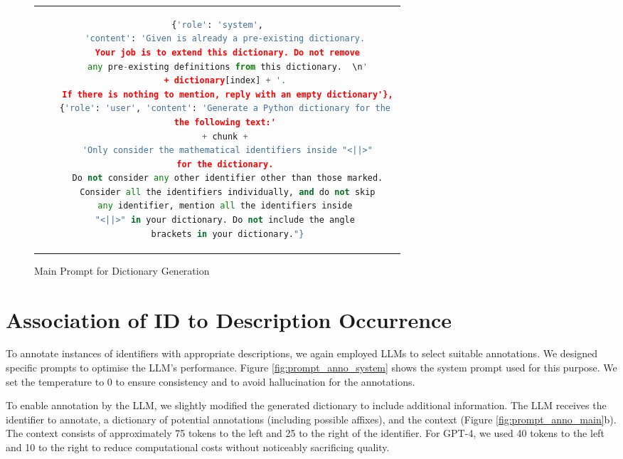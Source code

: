 \begin{figure}[htpb]
  \centering
  \begin{tabular}{c}
  \begin{lstlisting}[language=python]
    {'role': 'system',
    'content': 'Given is already a pre-existing dictionary. 
    Your job is to extend this dictionary. Do not remove
    any pre-existing definitions from this dictionary.  \n'
    + dictionary[index] + '. 
    If there is nothing to mention, reply with an empty dictionary'},
    {'role': 'user', 'content': 'Generate a Python dictionary for the 
    the following text:' 
    + chunk + 
    'Only consider the mathematical identifiers inside "<||>"
    for the dictionary. 
    Do not consider any other identifier other than those marked.
    Consider all the identifiers individually, and do not skip
    any identifier, mention all the identifiers inside 
    "<||>" in your dictionary. Do not include the angle 
    brackets in your dictionary."}
  \end{lstlisting}
  \end{tabular}
  \caption[Main Prompt for Dictionary Generation]{Main Prompt for Dictionary Generation} \label{fig:prompt_dic}
\end{figure}


\section{Association of ID to Description Occurrence}\label{sec:annotation}

To annotate instances of identifiers with appropriate descriptions, we again employed \ac{LLMs} to select suitable annotations. We designed specific prompts to optimise the LLM's performance. Figure \ref{fig:prompt_anno_system} shows the system prompt used for this purpose. We set the temperature to 0 to ensure consistency and to avoid hallucination for the annotations.

To enable annotation by the LLM, we slightly modified the generated dictionary to include additional information. The LLM receives the identifier to annotate, a dictionary of potential annotations (including possible affixes), and the context (Figure \ref{fig:prompt_anno_main}b). The context consists of approximately 75 tokens to the left and 25 to the right of the identifier. For GPT-4, we used 40 tokens to the left and 10 to the right to reduce computational costs without noticeably sacrificing quality.

